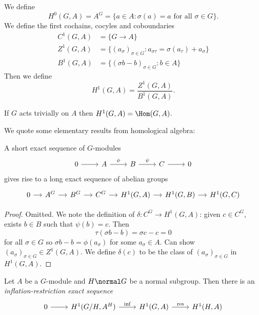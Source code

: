 \documentclass[a4paper]{article}
\theoremstyle{definition}
\theoremstyle{theorem}
\begin{document}
\begin{definition}
  We define
  \[
    H^0(G, A) = A^G = \{a \in A: \sigma(a) = a \text{ for all } \sigma \in G\}.
  \]
  We define the first cochains, cocyles and coboundaries 
  \begin{align*}
    C^1(G, A) &= \{G \to A\} \\
    Z^1(G, A) &= \{(a_\sigma)_{\sigma \in G}: a_{\sigma\tau} = \sigma(a_\tau) + a_\sigma\} \\
    B^1(G, A) &= \{(\sigma b - b)_{\sigma \in G}: b \in A\}
  \end{align*}
  Then we define
  \[
    H^1(G, A) = \frac{Z^1(G, A)}{B^1(G, A)}.
  \]
\end{definition}

\begin{remark}
  If \(G\) acts trivially on \(A\) then \(H^1(G, A) = \Hom(G, A)\).
\end{remark}

We quote some elementary results from homological algebra:

\begin{theorem}
  A short exact sequence of \(G\)-modules
  \[
    \begin{tikzcd}
      0 \ar[r] & A \ar[r, "\phi"] & B \ar[r, "\psi"] & C \ar[r] & 0
    \end{tikzcd}
  \]
  gives rise to a long exact sequence of abelian groups
  \[
    \begin{tikzcd}[column sep=small]
      0 \ar[r] & A^G \ar[r] & B^G \ar[r] & C^G \ar[r] & H^1(G, A) \ar[r] & H^1(G, B) \ar[r] & H^1(G, C)
    \end{tikzcd}
  \]
\end{theorem}

\begin{proof}
  Omitted. We note the definition of \(\delta: C^G \to H^1(G, A)\): given \(c \in C^G\), exists \(b \in B\) such that \(\psi(b) = c\). Then
  \[
    \tau(\sigma b - b) = \sigma c - c = 0
  \]
  for all \(\sigma \in G\) so \(\sigma b - b = \phi(a_\sigma)\) for some \(a_\sigma \in A\). Can show \((a_\sigma)_{\sigma \in G} \in Z^1(G, A)\). We define \(\delta(c)\) to be the class of \((a_\sigma)_{\sigma \in G}\) in \(H^1(G, A)\).
\end{proof}

\begin{theorem}
  Let \(A\) be a \(G\)-module and \(H \normal G\) be a normal subgroup. Then there is an \emph{inflation-restriction exact sequence}
  \[
    \begin{tikzcd}
      0 \ar[r] & H^1(G/H, A^H) \ar[r, "\mathrm{inf}"] & H^1(G, A) \ar[r, "\mathrm{res}"] & H^1(H, A)
    \end{tikzcd}
  \]
\end{theorem}
\end{document}
